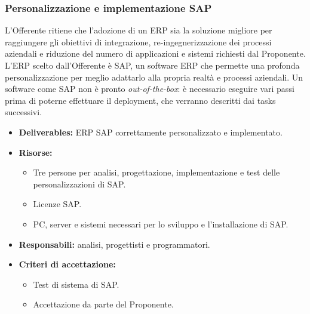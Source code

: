 			\subsubsection{Personalizzazione e implementazione SAP}
            	L'Offerente ritiene che l'adozione di un ERP sia la soluzione migliore per raggiungere gli obiettivi di integrazione, re-ingegnerizzazione dei processi aziendali e riduzione del numero di applicazioni e sistemi richiesti dal Proponente. L'ERP scelto dall'Offerente è SAP, un software ERP che permette una profonda personalizzazione per meglio adattarlo alla propria realtà e processi aziendali.
                Un software come SAP non è pronto \textit{out-of-the-box}: è necessario eseguire vari passi prima di poterne effettuare il deployment, che verranno descritti dai tasks successivi.
                \begin{itemize}
               		\item  \textbf{Deliverables:} ERP SAP correttamente personalizzato e implementato.
                    \item  \textbf{Risorse:} 
                    \begin{itemize}
                    	\item Tre persone per analisi, progettazione, implementazione e test delle personalizzazioni di SAP.
                        \item Licenze SAP.
                        \item PC, server e sistemi necessari per lo sviluppo e l'installazione di SAP.
                	\end{itemize}
                    \item  \textbf{Responsabili:} analisi, progettisti e programmatori.
                    \item  \textbf{Criteri di accettazione:} 
                    \begin{itemize}
                    	\item Test di sistema di SAP.
                        \item Accettazione da parte del Proponente.
                    \end{itemize}
                \end{itemize}
                
